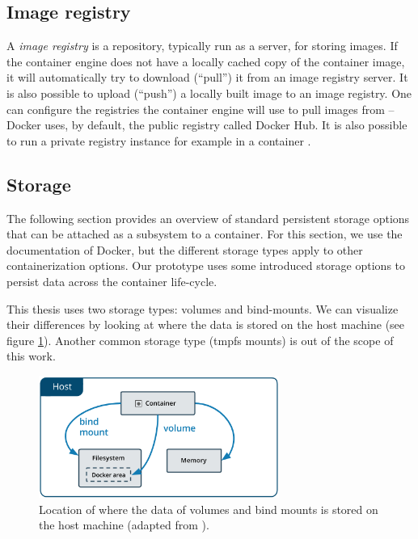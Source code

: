 \subsection{Image registry}
A \emph{image registry} is a repository, typically run as a server, for storing images. If the container engine does not have a locally cached copy of the container image, it will automatically try to download (``pull'') it from an image registry server. It is also possible to upload (``push'') a locally built image to an image registry. One can configure the registries the container engine will use to pull images from -- Docker uses, by default, the public registry called Docker Hub. It is also possible to run a private registry instance for example in a container \cite{dockerOverview}\cite{redHatContainerTerms}. 

\subsection{Storage}\label{container-storage}
The following section provides an overview of standard persistent storage options that can be attached as a subsystem to a container. For this section, we use the documentation of Docker, but the different storage types apply to other containerization options. Our prototype uses some introduced storage options to persist data across the container life-cycle. 

This thesis uses two storage types: volumes and bind-mounts. We can visualize their differences by looking at where the data is stored on the host machine (see figure \ref{fig:docker-storage-overview}). Another common storage type (tmpfs mounts) is out of the scope of this work.
\begin{figure}[h!]
  \centering
  \includegraphics[width=0.7\textwidth]{thesis/graphics/types-of-mounts.png}
  \caption{Location of where the data of volumes and bind mounts is stored on the host machine (adapted from \cite{DockerStorage}).}
  \label{fig:docker-storage-overview}
\end{figure}
